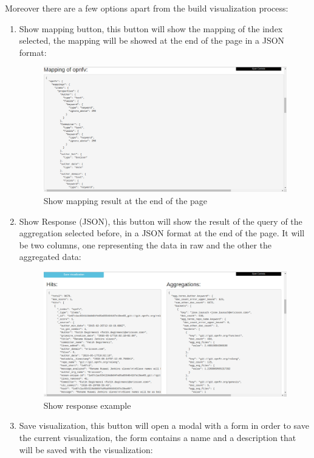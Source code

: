 \documentclass[a4paper, 12pt]{book}
\begin{document}
Moreover there are a few options apart from the build visualization process:
\begin{enumerate}
    \item Show mapping button, this button will show the mapping of the index selected, the mapping will be showed at the end of the page in a JSON format:
    \begin{figure}[H]
      \centering
      \includegraphics[width=16cm, keepaspectratio]{img/results/examplemapping}
      \caption{Show mapping result at the end of the page}
      \label{fig:onlynodes}
    \end{figure}
    \item Show Response (JSON), this button will show the result of the query of the aggregation selected before, in a JSON format at the end of the page. It will be two columns, one representing the data in raw and the other the aggregated data:
    \begin{figure}[H]
      \centering
      \includegraphics[width=16cm, keepaspectratio]{img/results/exampleresponse}
      \caption{Show response example}
      \label{fig:onlynodes}
    \end{figure}
    \item Save visualization, this button will open a modal with a form in order to save the current visualization, the form contains a name and a description that will be saved with the visualization:

\end{enumerate}
\end{document}
